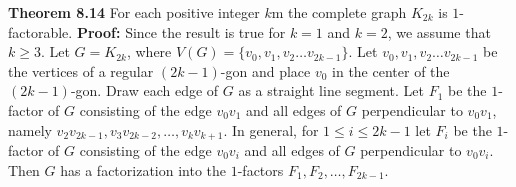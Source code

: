 \nopagenumbers
{\bf Theorem 8.14}
\vskip 6pt
For each positive integer $k$m the complete graph $K_{2k}$ is $1$-factorable.
\vskip 10pt
{\bf Proof:}
\vskip 6pt
Since the result is true for $k=1$ and $k=2$, we assume that $k \geq 3$. Let $G=K_{2k}$, where $V(G)= \lbrace v_0,v_1,v_2 \ldots v_{2k-1} \rbrace$. Let $v_0,v_1,v_2 \ldots v_{2k-1}$ be the vertices of a regular $(2k-1)$-gon and place $v_0$ in the center of the $(2k-1)$-gon. Draw each edge of $G$ as a straight line segment. Let $F_1$ be the $1$-factor of $G$ consisting of the edge $v_0v_1$ and all edges of $G$ perpendicular to $v_0v_1$, namely $v_2v_{2k-1},v_3v_{2k-2}, \ldots ,v_kv_{k+1}$. In general, for $1 \leq i \leq 2k-1$ let $F_i$ be the $1$-factor of $G$ consisting of the edge $v_0v_i$ and all edges of $G$ perpendicular to $v_0v_i$. Then $G$ has a factorization into the $1$-factors $F_1,F_2, \ldots ,F_{2k-1}$.

\vfill\eject
